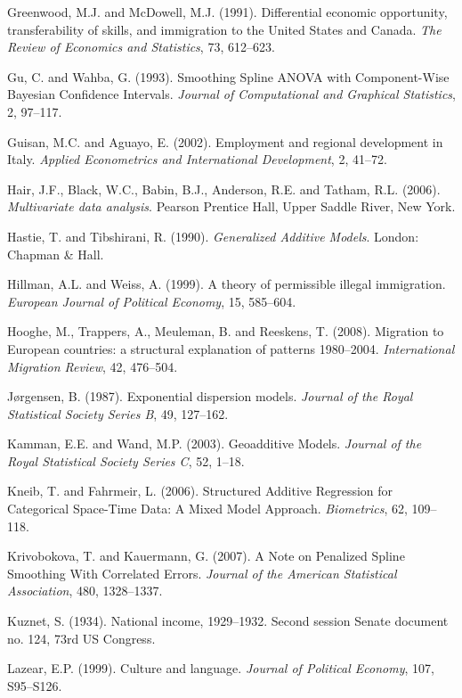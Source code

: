 \documentclass[12pt]{article}
\theoremstyle{definition}
\theoremstyle{plain}
\begin{document}
\begin{thebibliography}{99}
\bibitem{} Greenwood, M.J. and McDowell, M.J. (1991). Differential economic opportunity, transferability of skills, and immigration to the United States and Canada. \textit{The Review of Economics and Statistics}, 73, 612--623.

\bibitem{} Gu, C. and Wahba, G. (1993). Smoothing Spline ANOVA with Component-Wise Bayesian Confidence Intervals. \textit{Journal of Computational and Graphical Statistics}, 2, 97--117.

\bibitem{} Guisan, M.C. and Aguayo, E. (2002). Employment and regional development in Italy. \textit{Applied Econometrics and International Development}, 2, 41--72.

\bibitem{} Hair, J.F., Black, W.C., Babin, B.J., Anderson, R.E. and Tatham, R.L. (2006). \textit{Multivariate data analysis}. Pearson Prentice Hall, Upper Saddle River, New York.

\bibitem{} Hastie, T. and Tibshirani, R. (1990). \textit{Generalized Additive Models}. London: Chapman \& Hall.

\bibitem{} Hillman, A.L. and Weiss, A. (1999). A theory of permissible illegal immigration. \textit{European Journal of Political Economy}, 15, 585--604.

\bibitem{} Hooghe, M., Trappers, A., Meuleman, B. and Reeskens, T. (2008). Migration to European countries: a structural explanation of patterns 1980--2004. \textit{International Migration Review}, 42, 476--504.

\bibitem{} J\o rgensen, B. (1987). Exponential dispersion models. \textit{Journal of the Royal Statistical Society Series B}, 49, 127--162.

\bibitem{} Kamman, E.E. and Wand, M.P. (2003). Geoadditive Models. \textit{Journal of the Royal Statistical Society Series C}, 52, 1--18.

\bibitem{} Kneib, T. and Fahrmeir, L. (2006). Structured Additive Regression for Categorical Space-Time Data: A Mixed Model Approach. \textit{Biometrics}, 62, 109--118.

\bibitem{} Krivobokova, T. and Kauermann, G. (2007). A Note on Penalized Spline Smoothing With Correlated Errors. \textit{Journal of the American Statistical Association}, 480, 1328--1337.

\bibitem{} Kuznet, S. (1934). National income, 1929--1932. Second session Senate document no. 124, 73rd US Congress.

\bibitem{} Lazear, E.P. (1999). Culture and language. \textit{Journal of Political Economy}, 107, S95--S126.


\end{thebibliography}
\end{document}
